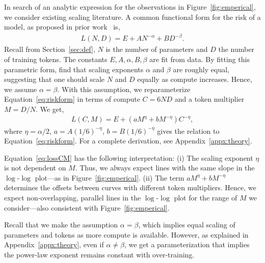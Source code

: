 In search of an analytic expression for the observations in Figure~\ref{fig:emperical}, we consider existing scaling literature.
A common functional form for the risk of a model, as proposed in prior work~\cite{rosenfeld_ConstructivePredictionGeneralization_2020,chinchilla} is,
\begin{align}
\label{eq:riskform}
L(N,D) = E + A N^{-\alpha} + B D^{-\beta}.
\end{align}
Recall from Section~\ref{sec:def}, $N$ is the number of parameters and $D$ the number of training tokens.
The constants $E, A, \alpha, B, \beta$ are fit from data.
By fitting this parametric form, \citet{chinchilla} find that scaling exponents $\alpha$ and $\beta$ are roughly equal, suggesting that one should scale $N$ and $D$ equally as compute increases. Hence, we assume $\alpha=\beta$. 
With this assumption, we reparameterize Equation~\eqref{eq:riskform} in terms of compute $C = 6ND$ and a token multiplier $M = D/N$. 
We get,
\begin{align}
\label{eq:lossCM}
L(C,M)
=
E + \left(a M^{\eta} + b M^{-\eta} \right) C^{-\eta},
\end{align}
where $\eta = \alpha/2$, $a = A(1/6)^{-\eta}$, $b=B(1/6)^{-\eta}$ gives the relation to Equation~\eqref{eq:riskform}.
For a complete derivation, see Appendix~\ref{appx:theory}.

Equation~\eqref{eq:lossCM} has the following interpretation:
(i) The scaling exponent $\eta$ is not dependent on $M$. Thus, we always expect lines with the same slope in the $\log$-$\log$ plot---as in Figure~\ref{fig:emperical}.  
(ii) The term $a M^{\eta} + b M^{-\eta}$ determines the offsets between curves with different token multipliers. Hence, we expect non-overlapping, parallel lines in the $\log$-$\log$ plot for the range of $M$ we consider---also consistent with Figure~\ref{fig:emperical}.

Recall that we make the assumption $\alpha=\beta$, which implies equal scaling of parameters and tokens as more compute is available. 
However, as explained in Appendix~\ref{appx:theory}, even if $\alpha\neq \beta$, we get a parameterization that implies the power-law exponent remains constant with over-training.


